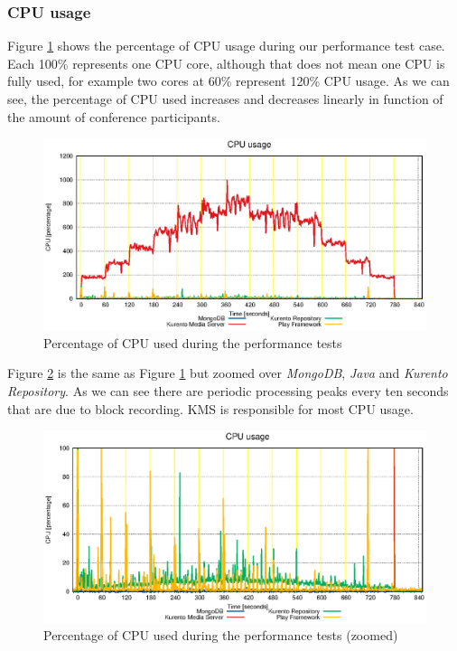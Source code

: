 \subsubsection{CPU usage}


Figure \ref{fig:test_full_features_cpu} shows the percentage of \ac{CPU} usage during our performance test case. Each 100\% represents one \ac{CPU} core, although that does not mean one \ac{CPU} is fully used, for example two cores at 60\% represent 120\% \ac{CPU} usage. As we can see, the percentage of \ac{CPU} used increases and decreases linearly in function of the amount of conference participants. 

\begin{figure}
  \centering
  \includegraphics[width=\textwidth]{stats/test_full_features_cpu.eps}
  \caption{Percentage of CPU used during the performance tests}
  \label{fig:test_full_features_cpu}
\end{figure}

Figure \ref{fig:test_full_features_cpu_zoom} is the same as Figure \ref{fig:test_full_features_cpu} but zoomed over \emph{MongoDB}, \emph{Java} and \emph{Kurento Repository}. As we can see there are periodic processing peaks every ten seconds that are due to block recording. \ac{KMS} is responsible for most \ac{CPU} usage.

\begin{figure}
  \centering
  \includegraphics[width=\textwidth]{stats/test_full_features_cpu_zoom.eps}
  \caption{Percentage of CPU used during the performance tests (zoomed)}
  \label{fig:test_full_features_cpu_zoom}
\end{figure}


